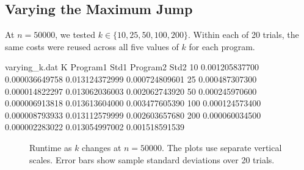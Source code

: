 \documentclass{article}
\begin{document}
\subsection{Varying the Maximum Jump}
At $n=50000$, we tested $k\in\{10,25,50,100,200\}$. Within each of 20 trials, the same costs were reused across all five values of $k$ for each program.

\begin{filecontents*}[overwrite]{varying_k.dat}
K Program1 Std1 Program2 Std2
10 0.001205837700 0.000036649758 0.013124372999 0.000724809601
25 0.000487307300 0.000014822297 0.013062036003 0.002062743920
50 0.000245970600 0.000006913818 0.013613604000 0.003477605390
100 0.000124573400 0.000008793933 0.013112579999 0.002603657680
200 0.000060034500 0.000002283022 0.013054997002 0.001518591539
\end{filecontents*}

\begin{figure}[H]
\centering
{}

\medskip
{}
\caption{Runtime as $k$ changes at $n=50000$. The plots use separate vertical scales. Error bars show sample standard deviations over 20 trials.}
\label{plot3}
\end{figure}
\end{document}
